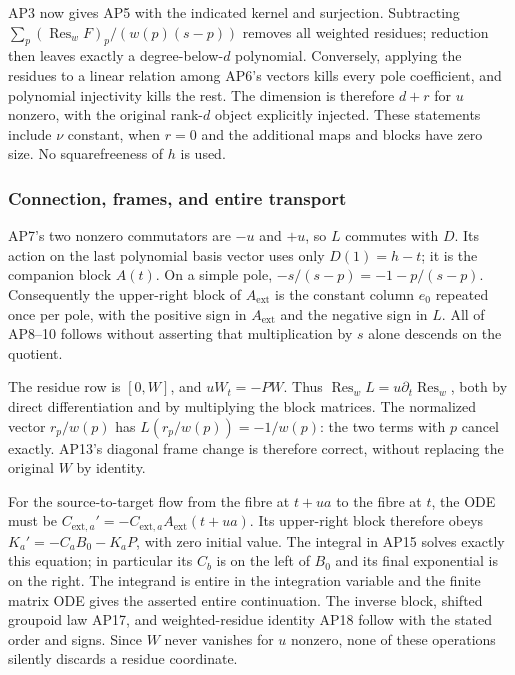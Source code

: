 AP3 now gives AP5 with the indicated kernel and surjection. Subtracting \(\sum_p(\operatorname{Res}_w F)_p/(w(p)(s-p))\) removes all weighted residues; reduction then leaves exactly a degree-below-\(d\) polynomial. Conversely, applying the residues to a linear relation among AP6's vectors kills every pole coefficient, and polynomial injectivity kills the rest. The dimension is therefore \(d+r\) for \(u\) nonzero, with the original rank-\(d\) object explicitly injected. These statements include \(\nu\) constant, when \(r=0\) and the additional maps and blocks have zero size. No squarefreeness of \(h\) is used.

\subsubsection{Connection, frames, and entire transport}\label{endpoint-analytic_pole_review--connection-frames-and-entire-transport}

AP7's two nonzero commutators are \(-u\) and \(+u\), so \(L\) commutes with \(D\). Its action on the last polynomial basis vector uses only \(D(1)=h-t\); it is the companion block \(A(t)\). On a simple pole, \(-s/(s-p)=-1-p/(s-p)\). Consequently the upper-right block of \(A_{\mathrm{ext}}\) is the constant column \(e_0\) repeated once per pole, with the positive sign in \(A_{\mathrm{ext}}\) and the negative sign in \(L\). All of AP8--10 follows without asserting that multiplication by \(s\) alone descends on the quotient.

The residue row is \([0,W]\), and \(u W_t=-P W\). Thus \(\operatorname{Res}_w L=u\partial_t\operatorname{Res}_w\), both by direct differentiation and by multiplying the block matrices. The normalized vector \(r_p/w(p)\) has \(L(r_p/w(p))=-1/w(p)\): the two terms with \(p\) cancel exactly. AP13's diagonal frame change is therefore correct, without replacing the original \(W\) by identity.

For the source-to-target flow from the fibre at \(t+ua\) to the fibre at \(t\), the ODE must be \(C_{\mathrm{ext},a}'=-C_{\mathrm{ext},a}A_{\mathrm{ext}}(t+ua)\). Its upper-right block therefore obeys \(K_a'=-C_a B_0-K_a P\), with zero initial value. The integral in AP15 solves exactly this equation; in particular its \(C_b\) is on the left of \(B_0\) and its final exponential is on the right. The integrand is entire in the integration variable and the finite matrix ODE gives the asserted entire continuation. The inverse block, shifted groupoid law AP17, and weighted-residue identity AP18 follow with the stated order and signs. Since \(W\) never vanishes for \(u\) nonzero, none of these operations silently discards a residue coordinate.

